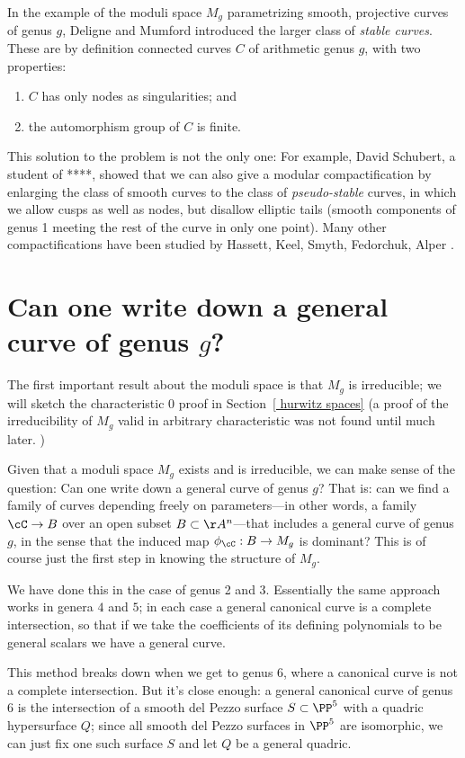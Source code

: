 In the example of the moduli space $M_g$ parametrizing smooth, projective curves of genus $g$, Deligne and Mumford introduced the larger class of \emph{stable curves}. These are by definition connected curves $C$ of arithmetic genus $g$, with two properties:

\begin{enumerate}
\item $C$ has only nodes as singularities; and
\item the automorphism group of $C$ is finite.
\end{enumerate}

This  solution to the problem is not the only one: For example, David Schubert, a student of ****, showed that we can also give a modular compactification by enlarging the class of smooth curves to the class of \emph{pseudo-stable} curves, in which we allow cusps as well as nodes, but disallow elliptic tails (smooth components of genus 1 meeting the rest of the curve in only one point). Many other compactifications have been studied by Hassett, Keel, Smyth, Fedorchuk, Alper .

\section{Can one write down a general curve of genus $g$?}

The first important result about the moduli space is that $M_g$ is irreducible; we will sketch the characteristic 0 proof in Section~\ref{ hurwitz spaces}  (a proof of the irreducibility of $M_g$ valid in arbitrary characteristic was not found until much later. )

Given that a moduli space $M_g$ exists and is irreducible, we can make sense of the question: Can one write down a general curve of genus $g$?
That is: can we find a family of curves depending freely on parameters---in other words, a family $\cC \to B$ over an open subset $B \subset \AA^n$---that includes a general curve of genus $g$, in the sense that the induced map $\phi_\cC : B \to M_g$ is dominant? This is of course just the first step in knowing the structure of $M_g$.

We have done this in the case of genus 2 and 3. Essentially
the same approach works in genera $4$ and $5$; in each case a general canonical curve is a complete intersection, so that if we take the coefficients of its defining polynomials to be general scalars we have a general curve.

This method breaks down when we get to genus 6, where a canonical curve is not a complete intersection. But it's close enough: a general canonical curve of genus 6 is the intersection of a smooth del Pezzo surface $S \subset \PP^5$ with a quadric hypersurface $Q$; since all smooth del Pezzo surfaces in $\PP^5$ are isomorphic, we can just fix one such surface $S$ and let $Q$ be a general quadric.

